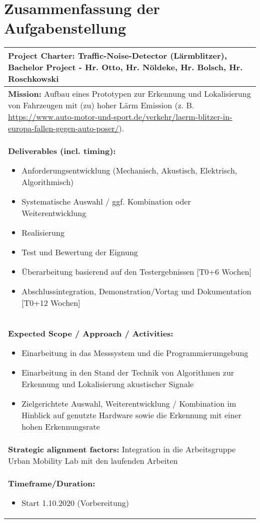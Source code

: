 \section{Zusammenfassung der Aufgabenstellung}

\begin{tabular}{|p{15cm}|}
\hline
\textbf{Project Charter:} Traffic-Noise-Detector (Lärmblitzer), Bachelor Project - Hr. Otto, Hr. Nöldeke, Hr. Bolsch, Hr. Roschkowski\\
\hline
\textbf{Mission:} Aufbau eines Prototypen zur Erkennung und Lokalisierung von Fahrzeugen mit (zu) hoher Lärm Emission (z. B. \url{https://www.auto-motor-und-sport.de/verkehr/laerm-blitzer-in-europa-fallen-gegen-auto-poser/}).\\
\hline
\textbf{Deliverables (incl. timing):}
\begin{itemize}
\item Anforderungsentwicklung (Mechanisch, Akustisch, Elektrisch, Algorithmisch)
\item Systematische Auswahl / ggf. Kombination oder Weiterentwicklung
\item Realisierung
\item Test und Bewertung der Eignung
\item Überarbeitung basierend auf den Testergebnissen [T0+6 Wochen]
\item Abschlussintegration, Demonstration/Vortag und Dokumentation [T0+12 Wochen]
\end{itemize}\\
\hline
\textbf{Expected Scope / Approach / Activities:}
\begin{itemize}
\item Einarbeitung in das Messsystem und die Programmierumgebung
\item Einarbeitung in den Stand der Technik von Algorithmen zur Erkennung und Lokalisierung akustischer Signale
\item Zielgerichtete Auswahl, Weiterentwicklung / Kombination im Hinblick auf genutzte Hardware sowie die Erkennung mit einer hohen Erkennungsrate
\end{itemize}\\
\hline
\textbf{Strategic alignment factors:}
\newline
Integration in die Arbeitsgruppe Urban Mobility Lab mit den laufenden Arbeiten\\
\hline
\textbf{Timeframe/Duration:}
\begin{itemize}
\item Start 1.10.2020 (Vorbereitung)

\end{itemize}
\end{tabular}

